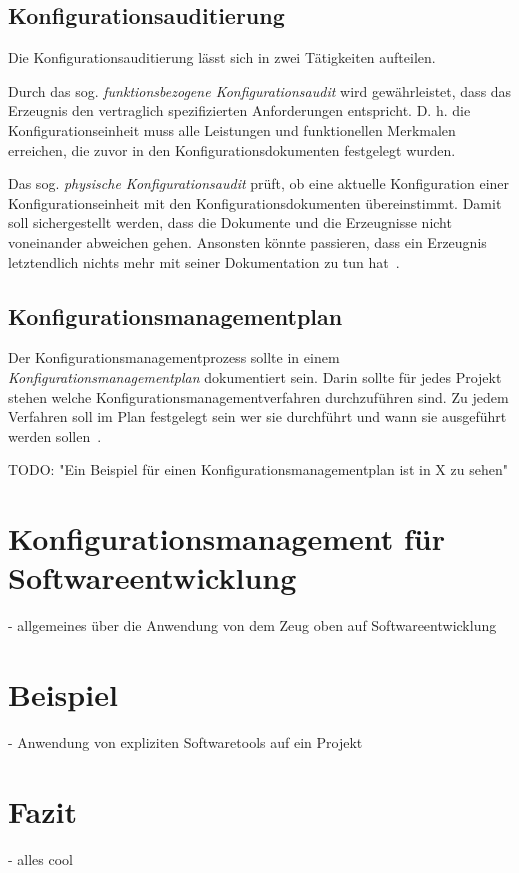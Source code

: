 \documentclass[runningheads,a4paper]{uwsese}
\begin{document}
\subsection{Konfigurationsauditierung}
Die Konfigurationsauditierung lässt sich in zwei Tätigkeiten aufteilen.

Durch das sog. {\em funktionsbezogene Konfigurationsaudit} wird gewährleistet,
dass das Erzeugnis den vertraglich spezifizierten Anforderungen entspricht.
D. h. die Konfigurationseinheit muss alle Leistungen und funktionellen Merkmalen
erreichen, die zuvor in den Konfigurationsdokumenten festgelegt wurden.

Das sog. {\em physische Konfigurationsaudit} prüft, ob eine aktuelle
Konfiguration einer Konfigurationseinheit mit den Konfigurationsdokumenten
übereinstimmt. Damit soll sichergestellt werden, dass die Dokumente und die
Erzeugnisse nicht voneinander abweichen gehen. Ansonsten könnte passieren, dass
ein Erzeugnis letztendlich nichts mehr mit seiner Dokumentation zu tun
hat~\cite[S. 7]{weischedel2002}.

\subsection{Konfigurationsmanagementplan}
Der Konfigurationsmanagementprozess sollte in einem
{\em Konfigurationsmanagementplan} dokumentiert sein. Darin sollte für jedes
Projekt stehen welche Konfigurationsmanagementverfahren durchzuführen sind. Zu
jedem Verfahren soll im Plan festgelegt sein wer sie durchführt und wann sie
ausgeführt werden sollen~\cite[S. 7f]{weischedel2002}.

TODO: "Ein Beispiel für einen Konfigurationsmanagementplan ist in X zu sehen"

\section{Konfigurationsmanagement für Softwareentwicklung}
- allgemeines über die Anwendung von dem Zeug oben auf Softwareentwicklung

\section{Beispiel}
- Anwendung von expliziten Softwaretools auf ein Projekt

\section{Fazit}
- alles cool



\end{document}
